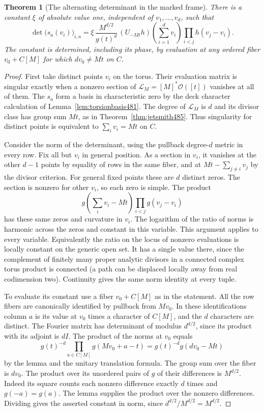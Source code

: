\documentclass[a4paper,11pt]{article}
\newtheorem{theorem}[proposition]{Theorem}
\theoremstyle{definition}
\theoremstyle{remark}
\numberwithin{equation}{section}
\begin{document}
\begin{theorem}[The alternating determinant in the marked frame]\leavevmode
\label{thm:thetaalternant486}
There is a constant \(\xi\) of absolute value one, independent
of \(v_1,\ldots,v_d\), such that
\[
 \det\bigl(s_a(v_i)\bigr)_{i,a}
  =\xi\,\frac{M^{d/2}}{g(t)^d}\,
     (U_{-Mt}h)\!\left(\sum_{i=1}^d v_i\right)
                 \prod_{i<j}h(v_j-v_i).
\]
The constant is determined, including its phase, by evaluation
at any ordered fiber \(v_0+C[M]\) for which \(d v_0\ne Mt\)
on \(C\).
\end{theorem}
\begin{proof}
First take distinct points \(v_i\) on the torus. Their evaluation
matrix is singular exactly when a nonzero section of
\(\mathcal L_M=[M]^*\mathcal O([t])\) vanishes at all of them.
The \(s_a\) form a basis in characteristic zero by the deck
character calculation of Lemma~\ref{lem:torsionbasis481}.
The degree of \(\mathcal L_M\) is \(d\) and its divisor class
has group sum \(Mt\), as in Theorem~\ref{thm:jetsmith485}.
Thus singularity for distinct points is equivalent to
\(\sum_i v_i=Mt\) on \(C\).

Consider the norm of the determinant, using the pullback
degree-\(d\) metric in every row. Fix all but \(v_i\) in general
position. As a section in \(v_i\), it vanishes at the other
\(d-1\) points by equality of rows in the same fiber, and at
\(Mt-\sum_{j\ne i}v_j\) by the divisor criterion. For general
fixed points these are \(d\) distinct zeros. The section is
nonzero for other \(v_i\), so each zero is simple. The product
\[
           g\!\left(\sum_i v_i-Mt\right)
                        \prod_{i<j}g(v_j-v_i)
\]
has these same zeros and curvature in \(v_i\). The logarithm
of the ratio of norms is harmonic across the zeros and constant
in this variable. This argument applies to every variable.
Equivalently the ratio on the locus of nonzero evaluations is
locally constant on the generic open set. It has a single value
there, since the complement of finitely many proper analytic
divisors in a connected complex torus product is connected
(a path can be displaced locally away from real codimension two).
Continuity gives the same norm identity at every tuple.

To evaluate its constant use a fiber \(v_0+C[M]\) as in the
statement. All the row fibers are canonically identified by
pullback from \(Mv_0\). In these identifications column \(a\)
is its value at \(v_0\) times a character of \(C[M]\), and
the \(d\) characters are distinct. The Fourier matrix has
determinant of modulus \(d^{d/2}\), since its product with its
adjoint is \(dI\). The product of the norms at \(v_0\) equals
\[
      g(t)^{-d}\prod_{a\in C[M]}g(Mv_0+a-t)
            =g(t)^{-d}g(dv_0-Mt)
\]
by the lemma and the unitary translation formula.
The group sum over the fiber is \(dv_0\). The product over its
unordered pairs of \(g\) of their differences is \(M^{d/2}\).
Indeed its square counts each nonzero difference exactly \(d\)
times and \(g(-a)=g(a)\). The lemma supplies the product over
the nonzero differences. Dividing gives the asserted constant
in norm, since \(d^{d/2}/M^{d/2}=M^{d/2}\).


\end{proof}
\end{document}
